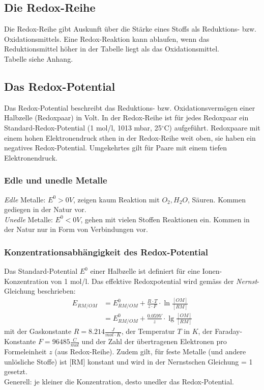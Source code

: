 \subsection{Die Redox-Reihe}
Die Redox-Reihe gibt Auskunft über die Stärke eines Stoffs als Reduktions- bzw. Oxidationsmittels. Eine Redox-Reaktion kann ablaufen, wenn das Reduktionsmittel höher in der Tabelle liegt als das Oxidationsmittel. \\
Tabelle siehe Anhang. 

\subsection{Das Redox-Potential}
Das Redox-Potential beschreibt das Reduktions- bzw. Oxidationsvermögen einer Halbzelle (Redoxpaar) in Volt. In der Redox-Reihe ist für jedes Redoxpaar ein Standard-Redox-Potential (1 mol/l, 1013 mbar, 25$^\circ$C) aufgeführt. Redoxpaare mit einem hohen Elektronendruck sthen in der Redox-Reihe weit oben, sie haben ein negatives Redox-Potential. Umgekehrtes gilt für Paare mit einem tiefen Elektronendruck.

\subsubsection{Edle und unedle Metalle}
\emph{Edle} Metalle: $E^0 > 0V$, zeigen kaum Reaktion mit $O_2, H_2O$, Säuren. Kommen gediegen in der Natur vor. \\
\emph{Unedle} Metalle: $E^0 < 0V$, gehen mit vielen Stoffen Reaktionen ein. Kommen in der Natur nur in Form von Verbindungen vor. 

\subsubsection{Konzentrationsabhängigkeit des Redox-Potential}
Das Standard-Potential $E^0$ einer Halbzelle ist definiert für eine Ionen-Konzentration von 1 mol/l. Das effektive Redoxpotential wird gemäss der \emph{Nernst}-Gleichung beschrieben:
\begin{eqnarray*}
	E_{RM/OM} &= E^0_{RM/OM} + \frac{R \cdot T}{z \cdot F} \cdot \ln\frac{[OM]}{[RM]} \\ &=  E^0_{RM/OM} + \frac{0.059V}{z} \cdot \lg\frac{[OM]}{[RM]}
\end{eqnarray*}
mit der Gaskonstante $R=8.214\frac{J}{mol \cdot K}$, der Temperatur $T$ in $K$, der Faraday-Konstante $F=96485\frac{C}{mol}$ und der Zahl der übertragenen Elektronen pro Formeleinheit $z$ (aus Redox-Reihe). Zudem gilt, für feste Metalle (und andere unlösliche Stoffe) ist [RM] konstant und wird in der Nernstschen Gleichung = 1 gesetzt. \\
Generell: je kleiner die Konzentration, desto unedler das Redox-Potential.

